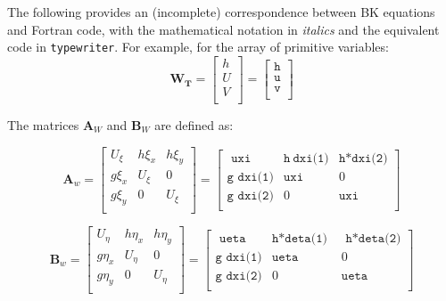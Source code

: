 \documentclass{article}
\newcommand{\code}[1]{\texttt{#1}}
\begin{document}
The following provides an (incomplete) correspondence between BK equations and Fortran code, with the mathematical notation in \textit{italics} and the equivalent code in \code{typewriter}.   For example, for the array of primitive variables:
\[  \mathbf{W_T} = 
\begin{bmatrix}
	h \\
	U \\
	V \\
\end{bmatrix}
 =  {
	 \begin{bmatrix}
	 \code{h} \\
	 \code{u} \\	 
	 \code{v} \\	 	 	 
\end{bmatrix} 
}  \]



The matrices $\mathbf{A}_W$ and $\mathbf{B}_W$ are defined as: 

\[ \mathbf{A}_w = 
\begin{bmatrix}
    U_{\xi} & h \xi_x & h \xi_{y} \\
    g \xi_x &    U_{\xi}  & 0    \\
    g \xi_y &   0   & U_{\xi}    \\    
\end{bmatrix} =
\begin{bmatrix}
    \code{ uxi }& \code{h} \ \code{dxi(1)} &\code{h*dxi(2)}\\
    \code{g dxi(1)}& \code{uxi} & 0  \\    
    \code{g dxi(2)}&     0       & \code{uxi}  \\          
\end{bmatrix} 
\]

\[ \mathbf{B}_w = 
\begin{bmatrix}
    U_{\eta} & h \eta_x    & h \eta_{y} \\
    g \eta_x &    U_{\eta}  & 0    \\
    g \eta_y &      0       & U_{\eta}    \\    
\end{bmatrix} =
\begin{bmatrix}
    \code{ ueta }  & \code{h*deta(1) } & \code{ h*deta(2)}\\
    \code{g dxi(1)} & \code{ueta}  & 0  \\    
    \code{g dxi(2)} &     0  	   &  \code{ueta}  \\          
\end{bmatrix} 
\]
\end{document}
